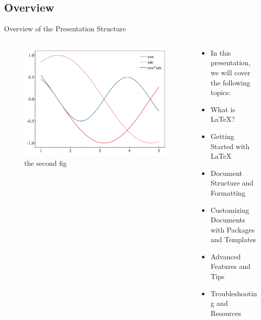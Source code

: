 \documentclass[aspectratio=169]{SUSTechBeamer}
\begin{document}
\subsection{Overview}
\begin{frame}{Overview of the Presentation Structure}\
    \begin{columns}
        \begin{column}{0.4\textwidth}
            \begin{figure}[h]
                \centering
                \includegraphics[width=\linewidth]{demo_fig/pngfig.png}
                \caption{the second fig}
                \label{fig:fig2}
            \end{figure}
        \end{column}
        \begin{column}{0.6\textwidth}
        \begin{itemize}
            \item In this presentation, we will cover the following topics:
            \item What is \LaTeX?
            \item Getting Started with \LaTeX
            \item Document Structure and Formatting
            \item Customizing Documents with Packages and Templates
            \item Advanced Features and Tips
            \item Troubleshooting and Resources
        \end{itemize}
    \end{column}
\end{columns}
\end{frame}
\end{document}

